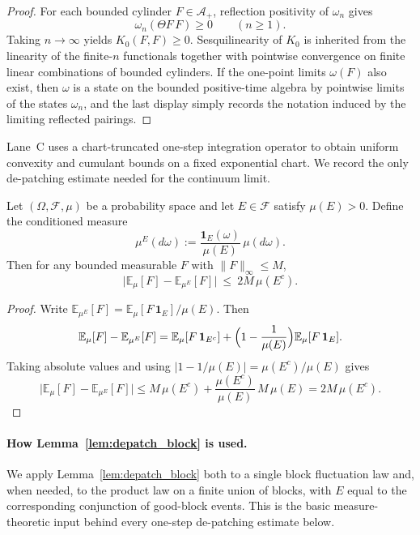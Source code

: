 \begin{proof}
For each bounded cylinder $F\in\mathcal A_+$, reflection positivity of $\omega_n$ gives
\[
\omega_n(\Theta F\,F)\ge 0\qquad(n\ge 1).
\]
Taking $n\to\infty$ yields $K_0(F,F)\ge 0$.
Sesquilinearity of $K_0$ is inherited from the linearity of the finite-$n$ functionals together with pointwise convergence on finite linear combinations of bounded cylinders.
If the one-point limits $\omega(F)$ also exist, then $\omega$ is a state on the bounded positive-time algebra by pointwise limits of the states $\omega_n$, and the last display simply records the notation induced by the limiting reflected pairings.
\end{proof}

Lane~C uses a chart-truncated one-step integration operator to obtain uniform convexity and cumulant bounds on a fixed exponential chart.
We record the only de-patching estimate needed for the continuum limit.

\begin{lemma}\label{lem:depatch_block}
Let $(\Omega,\mathscr F,\mu)$ be a probability space and let $E\in\mathscr F$ satisfy $\mu(E)>0$.
Define the conditioned measure
\[
\mu^{E}(d\omega):=\frac{\mathbf 1_{E}(\omega)}{\mu(E)}\,\mu(d\omega).
\]
Then for any bounded measurable $F$ with $\|F\|_\infty\le M$,
\[
\big|\mathbb E_{\mu}[F]-\mathbb E_{\mu^{E}}[F]\big|
\ \le\ 2M\,\mu(E^c).
\]
\end{lemma}

\begin{proof}
Write $\mathbb E_{\mu^{E}}[F]=\mathbb E_\mu[F\,\mathbf 1_{E}]/\mu(E)$.
Then
\[
\mathbb E_{\mu}[F]-\mathbb E_{\mu^{E}}[F]
=\mathbb E_\mu[F\,\mathbf 1_{E^c}]
+\Bigl(1-\frac{1}{\mu(E)}\Bigr)\mathbb E_\mu[F\,\mathbf 1_{E}].
\]
Taking absolute values and using $|1-1/\mu(E)|=\mu(E^c)/\mu(E)$ gives
\[
\big|\mathbb E_{\mu}[F]-\mathbb E_{\mu^{E}}[F]\big|
\le M\,\mu(E^c)+\frac{\mu(E^c)}{\mu(E)}\,M\,\mu(E)
=2M\,\mu(E^c).
\]
\end{proof}

\paragraph{How Lemma~\ref{lem:depatch_block} is used.}
We apply Lemma~\ref{lem:depatch_block} both to a single block fluctuation law and, when needed, to the product law on a finite union of blocks,
with $E$ equal to the corresponding conjunction of good-block events.
This is the basic measure-theoretic input behind every one-step de-patching estimate below.

